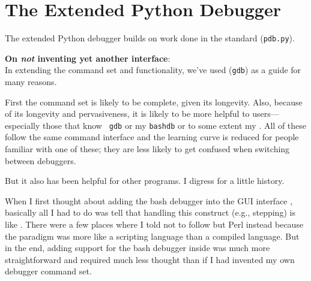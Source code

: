 

\chapter{The Extended Python Debugger \label{chapter-pydb}}

 

The extended Python debugger builds on work done in the standard
 ({\tt pdb.py}).

{\bf On \emph{not} inventing yet another interface}:\\
In extending the command set and functionality, we've used
 ({\tt gdb})
as a guide for many reasons.

First the command set is likely to be complete, given its
longevity. Also, because of its longevity and pervasiveness, it is
likely to be more helpful to users---especially those that know {\tt
gdb} or my 
{\tt bashdb} or to some extent my . All of these follow
the same command interface and the learning curve is reduced for
people familiar with one of these; they are less likely to get
confused when switching between debuggers.

But it also has been helpful for other programs. I digress for a
little history.

When I first thought about adding the bash debugger into the GUI
interface , basically all I had
to do was tell  that handling this construct (e.g.,
stepping) is like . There were a few places where I told 
not to follow  but Perl instead because the paradigm was
more like a scripting language than a compiled language. But in the
end, adding support for the bash debugger inside  was much more
straightforward and required much less thought than if I had invented
my own debugger command set.

